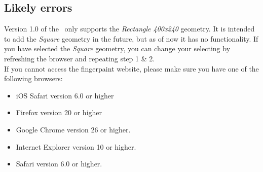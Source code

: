 \subsection{Likely errors}
Version 1.0 of the \applicationname\ only supports the \emph{Rectangle 400x240} geometry. It is intended to add the \emph{Square} geometry in the future, but as of now it has no functionality. If you have selected the \emph{Square} geometry, you can change your selecting by refreshing the browser and repeating step 1 \& 2.\\

\noindent If you cannot access the fingerpaint website, please make sure you have one of the following browsers:\\
\begin{itemize}
\item iOS Safari version 6.0 or higher
\item Firefox version 20 or higher
\item Google Chrome version 26 or higher.
\item Internet Explorer version 10 or higher.
\item Safari version 6.0 or higher.
\end{itemize}